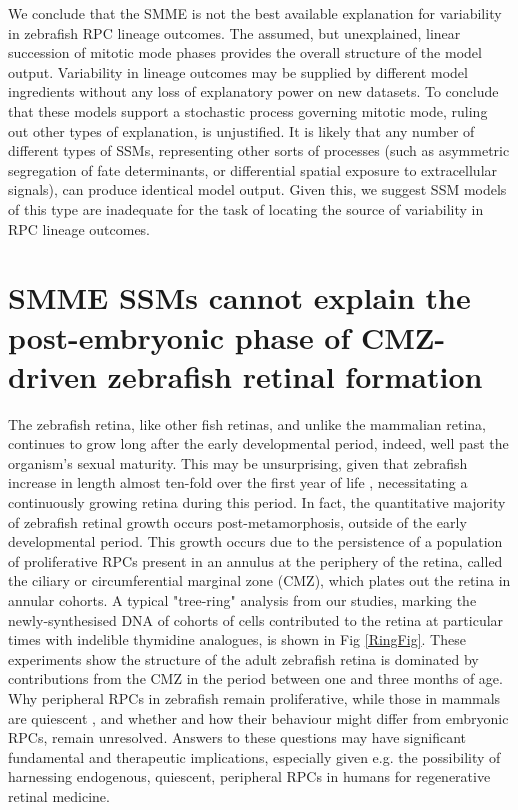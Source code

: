 \documentclass{ut-thesis}
\begin{document}
\begin{NoHyper}
We conclude that the SMME is not the best available explanation for variability in zebrafish RPC lineage outcomes. The assumed, but unexplained, linear succession of mitotic mode phases provides the overall structure of the model output. Variability in lineage outcomes may be supplied by different model ingredients without any loss of explanatory power on new datasets. To conclude that these models support a stochastic process governing mitotic mode, ruling out other types of explanation, is unjustified. It is likely that any number of different types of SSMs, representing other sorts of processes (such as asymmetric segregation of fate determinants, or differential spatial exposure to extracellular signals), can produce identical model output. Given this, we suggest SSM models of this type are inadequate for the task of locating the source of variability in RPC lineage outcomes.

\section{SMME SSMs cannot explain the post-embryonic phase of CMZ-driven zebrafish retinal formation}

The zebrafish retina, like other fish retinas, and unlike the mammalian retina, continues to grow long after the early developmental period, indeed, well past the organism's sexual maturity. This may be unsurprising, given that zebrafish increase in length almost ten-fold over the first year of life \cite{Parichy2009}, necessitating a continuously growing retina during this period. In fact, the quantitative majority of zebrafish retinal growth occurs post-metamorphosis, outside of the early developmental period. This growth occurs due to the persistence of a population of proliferative RPCs present in an annulus at the periphery of the retina, called the ciliary or circumferential marginal zone (CMZ), which plates out the retina in annular cohorts. A typical "tree-ring" analysis from our studies, marking the newly-synthesised DNA of cohorts of cells contributed to the retina at particular times with indelible thymidine analogues, is shown in Fig \ref{RingFig}. These experiments show the structure of the adult zebrafish retina is dominated by contributions from the CMZ in the period between one and three months of age. Why peripheral RPCs in zebrafish remain proliferative, while those in mammals are quiescent \cite{Tropepe2000}, and whether and how their behaviour might differ from embryonic RPCs, remain unresolved. Answers to these questions may have significant fundamental and therapeutic implications, especially given e.g. the possibility of harnessing endogenous, quiescent, peripheral RPCs in humans for regenerative retinal medicine.


\end{NoHyper}
\end{document}

